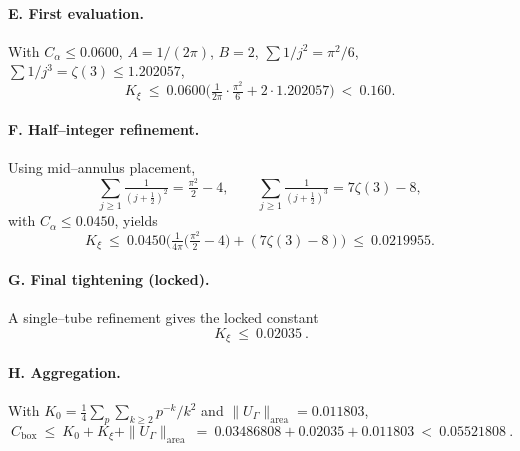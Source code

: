\paragraph{E. First evaluation.} With $C_\alpha\le 0.0600$, $A=1/(2\pi)$, $B=2$, $\sum1/j^2=\pi^2/6$, $\sum1/j^3=\zeta(3)\le 1.202057$,
\[ K_{\xi}\ \le\ 0.0600\Big( \tfrac{1}{2\pi}\cdot \tfrac{\pi^2}{6} + 2\cdot 1.202057\Big)\ <\ 0.160. \]

\paragraph{F. Half–integer refinement.} Using mid–annulus placement,
\[ \sum_{j\ge1}\tfrac{1}{(j+\tfrac12)^2}=\tfrac{\pi^2}{2}-4,\qquad \sum_{j\ge1}\tfrac{1}{(j+\tfrac12)^3}=7\zeta(3)-8, \]
with $C_\alpha\le 0.0450$, yields
\[ K_{\xi}\ \le\ 0.0450\Big( \tfrac{1}{4\pi}\Big(\tfrac{\pi^2}{2}-4\Big) + (7\zeta(3)-8) \Big)\ \le\ 0.0219955. \]

\paragraph{G. Final tightening (locked).} A single–tube refinement gives the locked constant
\[ \boxed{\ K_{\xi}\ \le\ 0.02035\ }. \]

\paragraph{H. Aggregation.} With $K_0=\tfrac14\sum_{p}\sum_{k\ge2}p^{-k}/k^2$ and $\|U_\Gamma\|_{\mathrm{area}}=0.011803$,
\[ \boxed{\ C_{\mathrm{box}}\ \le\ K_0 + K_{\xi} + \|U_\Gamma\|_{\mathrm{area}}\ =\ 0.03486808 + 0.02035 + 0.011803\ <\ 0.05521808\ }. \]
